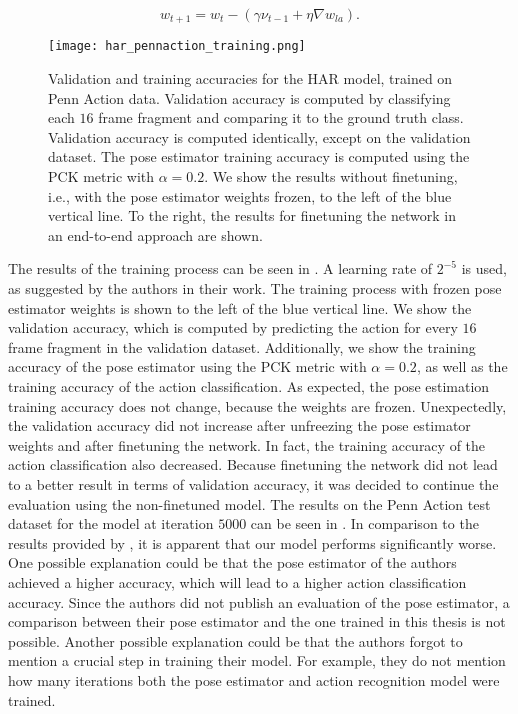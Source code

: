 \begin{equation}
    w_{t+1} = w_t - (\gamma \nu_{t-1} + \eta \nabla w_{la}).
\end{equation}

\begin{figure}[htb!]
    \centering
    \texttt{[image: har\_pennaction\_training.png]}
    \caption{Validation and training accuracies for the HAR model, trained on Penn Action data. Validation accuracy is computed by classifying each $16$ frame fragment and comparing it to the ground truth class. Validation accuracy is computed identically, except on the validation dataset. The pose estimator training accuracy is computed using the PCK metric with $\alpha = 0.2$. We show the results without finetuning, i.e., with the pose estimator weights frozen, to the left of the blue vertical line. To the right, the results for finetuning the network in an end-to-end approach are shown.}
    \label{fig:har_pennaction_results}
\end{figure}

The results of the training process can be seen in .
A learning rate of $2^{-5}$ is used, as suggested by the authors in their work.
The training process with frozen pose estimator weights is shown to the left of the blue vertical line.
We show the validation accuracy, which is computed by predicting the action for every $16$ frame fragment in the validation dataset.
Additionally, we show the training accuracy of the pose estimator using the PCK metric with $\alpha = 0.2$, as well as the training accuracy of the action classification.
As expected, the pose estimation training accuracy does not change, because the weights are frozen.
Unexpectedly, the validation accuracy did not increase after unfreezing the pose estimator weights and after finetuning the network.
In fact, the training accuracy of the action classification also decreased.
Because finetuning the network did not lead to a better result in terms of validation accuracy, it was decided to continue the evaluation using the non-finetuned model.
The results on the Penn Action test dataset for the model at iteration $5000$ can be seen in .
In comparison to the results provided by \cite{luvizon_2d/3d_2018}, it is apparent that our model performs significantly worse.
One possible explanation could be that the pose estimator of the authors achieved a higher accuracy, which will lead to a higher action classification accuracy.
Since the authors did not publish an evaluation of the pose estimator, a comparison between their pose estimator and the one trained in this thesis is not possible.
Another possible explanation could be that the authors forgot to mention a crucial step in training their model.
For example, they do not mention how many iterations both the pose estimator and action recognition model were trained.

